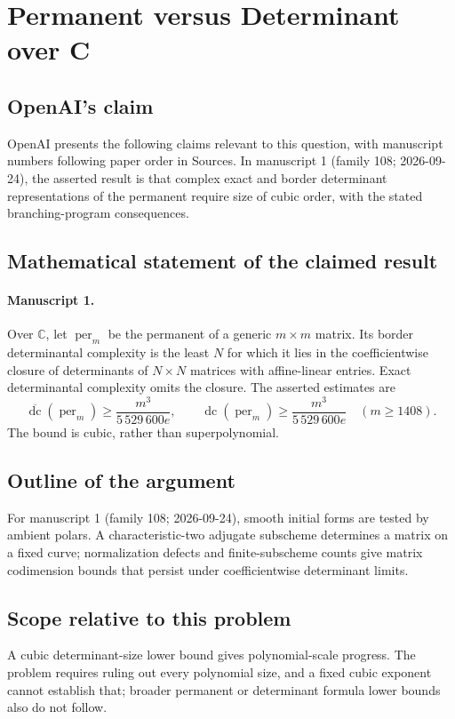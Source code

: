\documentclass[11pt]{article}
\begin{document}
\section*{Permanent versus Determinant over C}

\subsection{OpenAI's claim}
OpenAI presents the following claims relevant to this question, with manuscript numbers following paper order in Sources. In manuscript 1 (family 108; 2026-09-24), the asserted result is that complex exact and border determinant representations of the permanent require size of cubic order, with the stated branching-program consequences.

\subsection{Mathematical statement of the claimed result}
\paragraph{Manuscript 1.}
Over $\mathbb C$, let $\operatorname{per}_m$ be the permanent of a generic $m\times m$ matrix. Its border determinantal complexity is the least $N$ for which it lies in the coefficientwise closure of determinants of $N\times N$ matrices with affine-linear entries. Exact determinantal complexity omits the closure. The asserted estimates are
\[
 \overline{\operatorname{dc}}(\operatorname{per}_m)\ge\frac{m^3}{5\,529\,600e},\qquad
 \operatorname{dc}(\operatorname{per}_m)\ge\frac{m^3}{5\,529\,600e}\quad(m\ge1408).
\]
The bound is cubic, rather than superpolynomial.

\subsection{Outline of the argument}
For manuscript 1 (family 108; 2026-09-24), smooth initial forms are tested by ambient polars. A characteristic-two adjugate subscheme determines a matrix on a fixed curve; normalization defects and finite-subscheme counts give matrix codimension bounds that persist under coefficientwise determinant limits.

\subsection{Scope relative to this problem}
A cubic determinant-size lower bound gives polynomial-scale progress. The problem requires ruling out every polynomial size, and a fixed cubic exponent cannot establish that; broader permanent or determinant formula lower bounds also do not follow.
\end{document}
